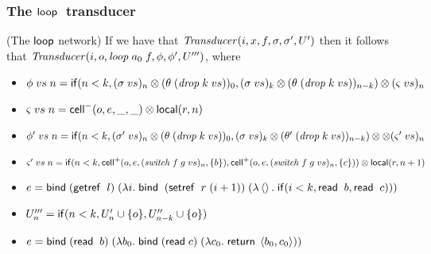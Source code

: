 \subsubsection{The $\mathsf{loop}\;$ transducer}
\begin{lemma}{(The $\mathsf{loop}$ network)}
If we have that $\mathit{Transducer}(i, x, f, \sigma, \sigma', U')$ 
then it follows that $\mathit{Transducer}(i, o, \mathit{loop}\;a_0\;f, \phi, \phi', U''')$, where 

\begin{itemize}
\item $\phi\;vs\;n = \mathsf{if}({n < k}, {(\sigma\;vs)_n \otimes (\theta\;(\mathit{drop}\;k\;vs))_0}, {(\sigma\;vs)_k \otimes (\theta\;(\mathit{drop}\;k\;vs))_{n-k}}) \otimes (\varsigma\;vs)_n$
\item $\varsigma\;vs\;n = \mathsf{cell}^{-}({o}, {e}, {\_}, {\_}) \otimes \mathsf{local}({r}, {n})$ 
\item $\phi'\;vs\;n = \mathsf{if}({n < k}, {(\sigma'\;vs)_n \otimes (\theta\;(\mathit{drop}\;k\;vs))_0}, {(\sigma\;vs)_k \otimes (\theta'\;(\mathit{drop}\;k\;vs))_{n-k}}) \otimes  \otimes (\varsigma'\;vs)_n$
\item $\varsigma'\;vs\;n = \mathsf{if}({n < k}, {\mathsf{cell}^{+}({o}, {e}, {(\mathit{switch}\;f\;g\;vs)_n}, {\{{b}\}})}, {\mathsf{cell}^{+}({o}, {e}, {(\mathit{switch}\;f\;g\;vs)_n}, {\{{c}\}})}) \otimes \mathsf{local}({r}, {n+1})$
\item $e = \mathsf{bind}\; (\mathsf{getref}\;\;l)\;(\lambda i.\;\mathsf{bind}\;\;(\mathsf{setref}\;\;r\;(i+1))\; (\lambda \left<\right>.\;\mathsf{if}({i < k}, {\mathsf{read}\;\;b}, {\mathsf{read}\;\;c})))$
\item $U'''_n = \mathsf{if}({n < k}, {U'_n \cup \{{o}\}}, {U''_{n-k} \cup \{{o}\}})$
\item $e = \mathsf{bind}\; (\mathsf{read}\;\;b)\; (\lambda b_0.\;\mathsf{bind}\; (\mathsf{read}\; c)\;(\lambda c_0.\;\mathsf{return}\;\left<{b_0},{c_0}\right>))$
\end{itemize}
\end{lemma}
